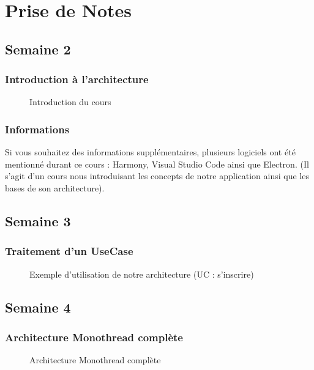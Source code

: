 \documentclass{article}[12pt]
\begin{document}


\tableofcontents%
\newpage
\section{Prise de Notes}
\subsection{Semaine 2}
\subsubsection{Introduction à l'architecture}
\begin{figure}[H]
    \centering
    \caption{Introduction du cours}
\end{figure}
\subsubsection{Informations}
Si vous souhaitez des informations supplémentaires, plusieurs logiciels ont été mentionné durant ce cours : Harmony, Visual Studio Code ainsi que Electron. (Il s'agit d'un cours nous introduisant les concepts de notre application ainsi que les bases de son architecture).
\subsection{Semaine 3}
\subsubsection{Traitement d'un UseCase}
\begin{figure}[H]
    \centering
    \caption{Exemple d'utilisation de notre architecture (UC : s'inscrire)}
\end{figure}
\subsection{Semaine 4}
\subsubsection{Architecture Monothread complète}
\begin{figure}[H]
    \centering
    \caption{Architecture Monothread complète}
\end{figure}
\end{document}
